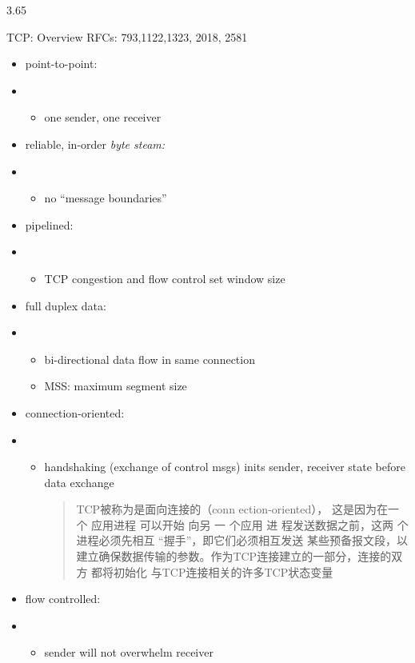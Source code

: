 \documentclass[
]{article}
\begin{document}
3.65

TCP: Overview RFCs: 793,1122,1323, 2018, 2581

\begin{itemize}
\item
  point-to-point:
\item
  \begin{itemize}
  \item
    one sender, one receiver
  \end{itemize}
\item
  reliable, in-order \emph{byte steam:}
\item
  \begin{itemize}
  \item
    no ``message boundaries''
  \end{itemize}
\item
  pipelined:
\item
  \begin{itemize}
  \item
    TCP congestion and flow control set window size
  \end{itemize}
\item
  full duplex data:
\item
  \begin{itemize}
  \item
    bi-directional data flow in same connection
  \item
    MSS: maximum segment size
  \end{itemize}
\item
  connection-oriented:
\item
  \begin{itemize}
  \item
    handshaking (exchange of control msgs) inits sender, receiver state
    before data exchange

    \begin{quote}
    TCP被称为是面向连接的（conn ection-oriented）， 这是因为在一个
    应用进程 可以开始 向另 一 个应用 进 程发送数据之前，这两
    个进程必须先相互 ``握手''，即它们必须相互发送
    某些预备报文段，以建立确保数据传输的参数。作为TCP连接建立的一部分，连接的双方
    都将初始化 与TCP连接相关的许多TCP状态变量
    \end{quote}
  \end{itemize}
\item
  flow controlled:
\item
  \begin{itemize}
  \item
    sender will not overwhelm receiver
  \end{itemize}
\end{itemize}
\end{document}
